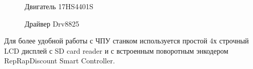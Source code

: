 \documentclass[a4paper,12pt]{article}
\theoremstyle{plain}                          %
\theoremstyle{definition}                     %
\theoremstyle{remark}                         %
\begin{document}
\begin{figure}[H]
    \caption{Двигатель 17HS4401S}
\end{figure}

\begin{figure}[H]
    \caption{Драйвер Drv8825}
\end{figure}

Для более удобной работы с ЧПУ станком используется простой 4х
строчный LCD дисплей с SD card reader и с встроенным поворотным
энкодером RepRapDiscount Smart Controller.
\end{document}
